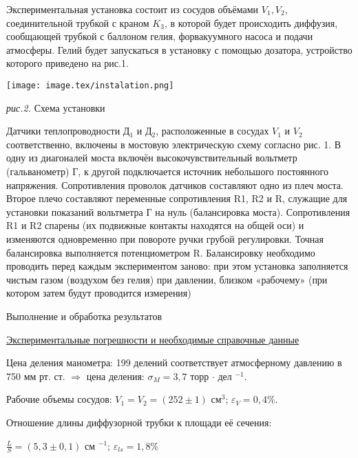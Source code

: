 \documentclass{article}
\begin{document}
Экспериментальная установка состоит из сосудов объёмами \(V_{1}, V_{2}\), соединительной трубкой с краном \(K_{3}\), в которой будет происходить диффузия, сообщающей трубкой с баллоном гелия, форвакуумного насоса и подачи атмосферы. Гелий будет запускаться в установку с помощью дозатора, устройство которого приведено на рис.1.

\begin{center}
    \texttt{[image: image.tex/instalation.png]}

    \textit{рис.2.} Схема установки
\end{center}

Датчики теплопроводности Д\(_{1}\) и Д\(_{2}\), расположенные в сосудах \(V_{1}\) и \(V_{2}\) соответственно, включены в мостовую электрическую схему согласно рис. 1. В одну из диагоналей моста включён высокочувствительный вольтметр (гальванометр) Г, к другой подключается источник небольшого постоянного напряжения. Сопротивления проволок датчиков составляют одно из плеч моста. Второе плечо составляют переменные сопротивления R1, R2 и R, служащие для установки показаний вольтметра Г на нуль (балансировка моста). Сопротивления R1 и R2 спарены (их подвижные контакты находятся на общей оси) и изменяются одновременно при повороте ручки грубой регулировки. Точная балансировка выполняется потенциометром R. Балансировку необходимо проводить перед каждым экспериментом заново: при этом установка заполняется чистым газом (воздухом без гелия) при давлении, близком «рабочему» (при котором затем будут проводится измерения)
\\
\begin{center}
    \raggedleft
    {
        \LARGE {Выполнение и обработка результатов}
    }
    \hline
    \hline
\end{center}

\begin{center}
    \raggedleft
    {
        \large{\underline{Экспериментальные погрешности и необходимые справочные данные}}
    }
\end{center}

Цена деления манометра: 199 делений соответствует атмосферному давлению в 750 мм рт.  ст. \(\Rightarrow\) цена деления: \(\sigma_{M} = 3,7\) торр \(\cdot\) дел \(^{-1}\).

Рабочие объемы сосудов: \(V_{1} = V_{2} = (252 \pm 1)\) см\(^{3}\); \(\varepsilon_{V} =  0,4\%\).

Отношение длины диффузорной трубки к площади её сечения:

\(\frac{L}{S} = (5,3 \pm 0,1)\) см \(^{-1}\); \(\varepsilon_{ls} = 1,8 \%\)
\end{document}

